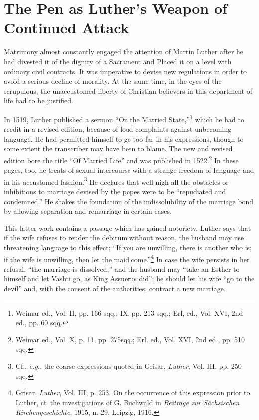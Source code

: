 \section{The Pen as Luther’s Weapon of Continued Attack}

Matrimony almost constantly engaged the attention of Martin
Luther after he had divested it of the dignity of a Sacrament and
Placed it on a level with ordinary civil contracts. It was imperative
to devise new regulations in order to avoid a serious decline of
morality. At the same time, in the eyes of the scrupulous, the unaccustomed
liberty of Christian believers in this department of life
had to be justified.

In 1519, Luther published a sermon “On the Married State,”\footnote
{Weimar ed., Vol. II, pp. 166 sqq.; IX, pp. 213 sqq.; Erl, ed., Vol. XVI, 2nd ed., pp.
60 sqq.}
which he had to reedit in a revised edition, because of loud complaints
against unbecoming language. He had permitted himself
to go too far in his expressions, though to some extent the transcriber
may have been to blame. The new and revised edition bore the title
“Of Married Life” and was published in 1522.\footnote
{Weimar ed., Vol. X, p. 11, pp. 275sqq.; Erl. ed., Vol. XVI, 2nd ed., pp. 510 sqq.}
In these pages,
too, he treats of sexual intercourse with a strange freedom of language
and in his accustomed fashion.\footnote
{Cf., \textit{e.g.}, the coarse expressions quoted in Grisar, \textit{Luther}, Vol. III, pp. 250 sqq.}
He declares that well-nigh all the
obstacles or inhibitions to marriage devised by the popes were to
be “repudiated and condemned.” He shakes the foundation of the
indissolubility of the marriage bond by allowing separation and remarriage
in certain cases.

This latter work contains a passage which has gained notoriety. Luther
says that if the wife refuses to render the debitum without reason, the
husband may use threatening language to this effect: “If you are unwilling,
there is another who is; if the wife is unwilling, then let the maid come.”\footnote
{Grisar, \textit{Luther}, Vol. III, p. 253. On the occurrence of this expression prior to Luther,
cf. the investigations of G. Buchwald in \textit{Beiträge zur Sächsischen Kirchengeschichte}, 1915,
n. 29, Leipzig, 1916.}
In case the wife persists in her refusal, “the marriage is dissolved,” and the
husband may “take an Esther to himself and let Vashti go, as King Assuerus
did”; he should let his wife “go to the devil” and, with the consent of the
authorities, contract a new marriage.


